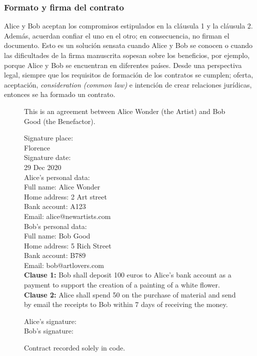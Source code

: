 \documentclass[12pt]{report} %
\begin{document}
\subsubsection{Formato y firma del contrato}

Alice y Bob aceptan los compromisos estipulados en la cláusula 1 y la cláusula 2. Además, acuerdan confiar el uno en el otro; en consecuencia, no firman el documento. Esto es un solución sensata cuando Alice y Bob se conocen o cuando las dificultades de la firma manuscrita sopesan sobre los beneficios, por ejemplo, porque Alice y Bob se encuentran en diferentes países. Desde una perspectiva legal, siempre que los requisitos de formación de los contratos se cumplen; oferta, aceptación, \textit{consideration (common law)} e intención de crear relaciones jurídicas, entonces se ha formado un contrato.

\begin{figure}
\begin{tcolorbox}[width=\textwidth,
   title={This is a contract between Alice and Bob.},
   colframe=black!75!white,
   colbacktitle=gray!50!white, coltitle=black,
   colupper=black,    colback=green!5!white]

 This is an agreement between Alice Wonder (the Artist) and 
 Bob Good (the Benefactor). 

\vspace{0.5cm}
Signature place: \\
Florence\\

Signature date:\\
29 Dec 2020 \\

Alice's personal data: \\
Full name:  Alice Wonder \\
Home address: 2 Art street \\
Bank account: A123 \\
Email: alice@newartists.com \\

Bob's personal data: \\
Full name: Bob Good \\
Home address: 5 Rich Street \\
Bank account: B789 \\
Email: bob@artlovers.com \\



\textbf{Clause 1:}  Bob shall deposit 100 euros to Alice's bank 
  account as a payment to support the creation of a painting of 
  a white flower. \\

\textbf{Clause 2:}  Alice shall spend 50 on the purchase of 
  material and send by email the receipts to Bob 
  within 7 days of receiving the money.

\vspace{0.5 cm}
Alice's signature: \\ 

Bob's signature:  \\
\end{tcolorbox}
\caption{Contract recorded solely in code.}
\label{box:contsolecode}
\end{figure}
\end{document}
